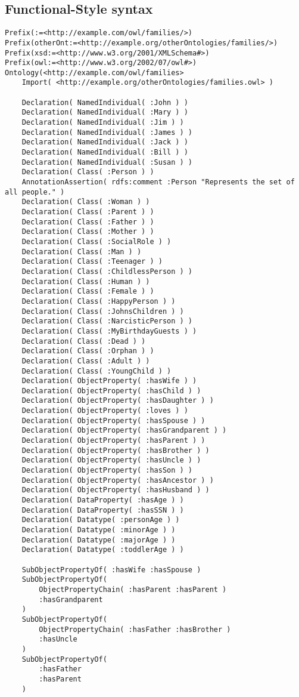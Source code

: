 \documentclass[11pt,a4paper,final,oneside,onecolumn]{article}
\begin{document}
	\subsection{Functional-Style syntax}
	
	\begin{lstlisting}[language=Functional-style]
Prefix(:=<http://example.com/owl/families/>)
Prefix(otherOnt:=<http://example.org/otherOntologies/families/>)
Prefix(xsd:=<http://www.w3.org/2001/XMLSchema#>)
Prefix(owl:=<http://www.w3.org/2002/07/owl#>)
Ontology(<http://example.com/owl/families>
	Import( <http://example.org/otherOntologies/families.owl> )
	
	Declaration( NamedIndividual( :John ) )
	Declaration( NamedIndividual( :Mary ) )
	Declaration( NamedIndividual( :Jim ) )
	Declaration( NamedIndividual( :James ) )
	Declaration( NamedIndividual( :Jack ) )
	Declaration( NamedIndividual( :Bill ) )
	Declaration( NamedIndividual( :Susan ) )
	Declaration( Class( :Person ) )
	AnnotationAssertion( rdfs:comment :Person "Represents the set of all people." )
	Declaration( Class( :Woman ) )
	Declaration( Class( :Parent ) )
	Declaration( Class( :Father ) )
	Declaration( Class( :Mother ) )
	Declaration( Class( :SocialRole ) )
	Declaration( Class( :Man ) )
	Declaration( Class( :Teenager ) )
	Declaration( Class( :ChildlessPerson ) )
	Declaration( Class( :Human ) )
	Declaration( Class( :Female ) )
	Declaration( Class( :HappyPerson ) )
	Declaration( Class( :JohnsChildren ) )
	Declaration( Class( :NarcisticPerson ) )
	Declaration( Class( :MyBirthdayGuests ) )
	Declaration( Class( :Dead ) )
	Declaration( Class( :Orphan ) )
	Declaration( Class( :Adult ) )
	Declaration( Class( :YoungChild ) )
	Declaration( ObjectProperty( :hasWife ) )
	Declaration( ObjectProperty( :hasChild ) )
	Declaration( ObjectProperty( :hasDaughter ) )
	Declaration( ObjectProperty( :loves ) )
	Declaration( ObjectProperty( :hasSpouse ) )
	Declaration( ObjectProperty( :hasGrandparent ) )
	Declaration( ObjectProperty( :hasParent ) )
	Declaration( ObjectProperty( :hasBrother ) )
	Declaration( ObjectProperty( :hasUncle ) )
	Declaration( ObjectProperty( :hasSon ) )
	Declaration( ObjectProperty( :hasAncestor ) )
	Declaration( ObjectProperty( :hasHusband ) )
	Declaration( DataProperty( :hasAge ) )
	Declaration( DataProperty( :hasSSN ) )
	Declaration( Datatype( :personAge ) )
	Declaration( Datatype( :minorAge ) )
	Declaration( Datatype( :majorAge ) )
	Declaration( Datatype( :toddlerAge ) )
	
	SubObjectPropertyOf( :hasWife :hasSpouse )
	SubObjectPropertyOf(
		ObjectPropertyChain( :hasParent :hasParent )
		:hasGrandparent
	)
	SubObjectPropertyOf(
		ObjectPropertyChain( :hasFather :hasBrother )
		:hasUncle
	)
	SubObjectPropertyOf(
		:hasFather
		:hasParent
	)
	

\end{lstlisting}
\end{document}
